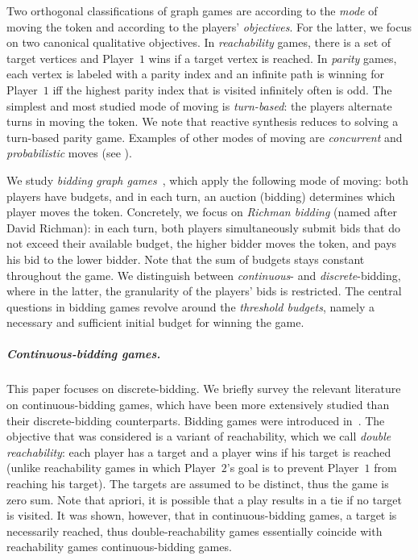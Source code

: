\documentclass{theoretics}
\newcommand{\PO}{Player~$1$\xspace}
\newcommand{\PT}{Player~$2$\xspace}
\begin{document}
Two orthogonal classifications of graph games are according to the {\em mode} of moving the token and according to the players' {\em objectives}. For the latter, we focus on two canonical qualitative objectives. In {\em reachability} games, there is a set of target vertices and \PO wins if a target vertex is reached. 
In {\em parity} games, each vertex is labeled with a parity index and an infinite path is winning for \PO iff the highest parity index that is visited infinitely often is odd. The simplest and most studied mode of moving is {\em turn-based}:  the players alternate turns in moving the token. We note that reactive synthesis reduces to solving a turn-based parity game. Examples of other modes of moving are {\em concurrent} and {\em probabilistic} moves (see \cite{AG11}). 

We study \emph{bidding graph games}~\cite{LLPU96,LLPSU99}, which apply the following mode of moving: both players have budgets, and in each turn, an auction (bidding) determines which player moves the token. Concretely, we focus on {\em Richman bidding} (named after David Richman): in each turn, both players simultaneously submit bids that do not exceed their available budget, the higher bidder moves the token, and pays his bid to the lower bidder. Note that the sum of budgets stays constant throughout the game. 
We distinguish between {\em continuous}- and {\em discrete}-bidding, where in the latter, the granularity of the players' bids is restricted. 
The central questions in bidding games revolve around the {\em threshold budgets}, namely a necessary and sufficient initial budget for winning the game. 


\subparagraph*{Continuous-bidding games.} 
This paper focuses on discrete-bidding. We briefly survey the relevant literature on continuous-bidding games, which have been more extensively studied than their discrete-bidding counterparts. Bidding games were introduced in~\cite{LLPU96,LLPSU99}. The objective that was considered is a variant of reachability, which we call {\em double reachability}: each player has a target and a player wins if his target is reached (unlike reachability games in which \PT's goal is to prevent \PO from reaching his target). The targets are assumed to be distinct, thus the game is zero sum. Note that apriori, it is possible that a play results in a tie if no target is visited. It was shown, however, that in continuous-bidding games, a target is necessarily reached, thus double-reachability games essentially coincide with reachability games continuous-bidding games. 
\end{document}
